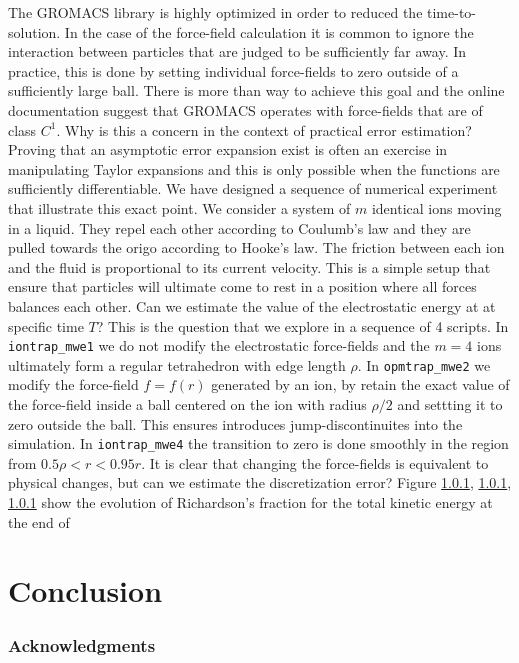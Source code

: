 \documentclass[runningheads]{llncs}
\begin{document}
The GROMACS library is highly optimized in order to reduced the time-to-solution. In the case of the force-field calculation it is common to ignore the interaction between particles that are judged to be sufficiently far away. In practice, this is done by setting individual force-fields to zero outside of a sufficiently large ball. There is more than way to achieve this goal and the online documentation suggest that GROMACS operates with force-fields that are of class $C^1$. Why is this a concern in the context of practical error estimation? Proving that an asymptotic error expansion exist is often an exercise in manipulating Taylor expansions and this is only possible when the functions are sufficiently differentiable. We have designed a sequence of numerical experiment that illustrate this exact point. We consider a system of $m$ identical ions moving in a liquid. They repel each other according to Coulumb's law and they are pulled towards the origo according to Hooke's law. The friction between each ion and the fluid is proportional to its current velocity. This is a simple setup that ensure that particles will ultimate come to rest in a position where all forces balances each other. Can we estimate the value of the electrostatic energy at at specific time $T$? This is the question that we explore in a sequence of 4 scripts. In {\tt iontrap_mwe1} we do not modify the electrostatic force-fields and the $m=4$ ions ultimately form a regular tetrahedron with edge length $\rho$. In {\tt opmtrap_mwe2} we modify the force-field $f = f(r)$ generated by an ion, by retain the exact value of the force-field inside a ball centered on the ion with radius $\rho/2$ and settting it to zero outside the ball. This ensures introduces jump-discontinuites into the simulation. In {\tt iontrap_mwe4} the transition to zero is done smoothly in the region from $0.5 \rho < r < 0.95 r$. It is clear that changing the force-fields is equivalent to physical changes, but can we estimate the discretization error? Figure \ref{}, \ref{}, \ref{} show the evolution of Richardson's fraction for the total kinetic energy at the end of 

\section{Conclusion}



\subsubsection{Acknowledgments}
\end{document}
